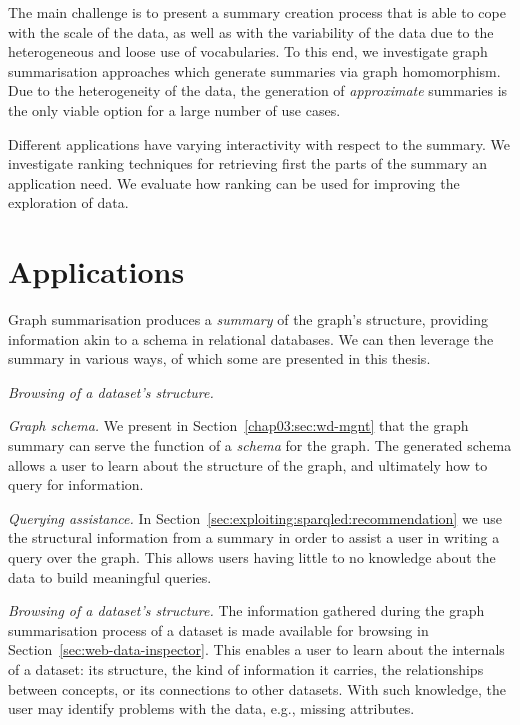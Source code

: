 The main challenge is to present a summary creation process that is able to cope with the scale of the data, as well as with the variability of the data due to the heterogeneous and loose use of vocabularies. To this end, we investigate graph summarisation approaches which generate summaries via graph homomorphism. Due to the heterogeneity of the data, the generation of \emph{approximate} summaries is the only viable option for a large number of use cases.

Different applications have varying interactivity with respect to the summary. We investigate ranking techniques for retrieving first the parts of the summary an application need. We evaluate how ranking can be used for improving the exploration of data.

\section{Applications}

Graph summarisation produces a \emph{summary} of the graph's structure, providing information akin to a schema in relational databases. We can then leverage the summary in various ways, of which some are presented in this thesis.

\begin{labeling}{\emph{Browsing of a dataset's structure.}}
\item[\emph{Graph schema.}] We present in Section~\ref{chap03:sec:wd-mgnt} that the graph summary can serve the function of a \emph{schema} for the graph. The generated schema allows a user to learn about the structure of the graph, and ultimately how to query for information.
\item[\emph{Querying assistance.}] In Section~\ref{sec:exploiting:sparqled:recommendation} we use the structural information from a summary in order to assist a user in writing a query over the graph. This allows users having little to no knowledge about the data to build meaningful queries.
\item[\emph{Browsing of a dataset's structure.}] The information gathered during the graph summarisation process of a dataset is made available for browsing in Section~\ref{sec:web-data-inspector}. This enables a user to learn about the internals of a dataset: its structure, the kind of information it carries, the relationships between concepts, or its connections to other datasets. With such knowledge, the user may identify problems with the data, e.g., missing attributes.
\end{labeling}

